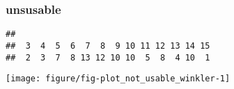 \documentclass[a4]{article}\usepackage[]{graphicx}\usepackage[]{color}
\makeatletter
\def\maxwidth{ %
  \ifdim\Gin@nat@width>\linewidth
    \linewidth
  \else
    \Gin@nat@width
  \fi
}
\newenvironment{kframe}{%
 \def\at@end@of@kframe{}%
 \ifinner\ifhmode%
  \def\at@end@of@kframe{\end{minipage}}%
  \begin{minipage}{\columnwidth}%
 \fi\fi%
 \def\FrameCommand##1{\hskip\@totalleftmargin \hskip-\fboxsep
 \colorbox{shadecolor}{##1}\hskip-\fboxsep
     \hskip-\linewidth \hskip-\@totalleftmargin \hskip\columnwidth}%
 \MakeFramed {\advance\hsize-\width
   \@totalleftmargin\z@ \linewidth\hsize
   \@setminipage}}%
 {\par\unskip\endMakeFramed%
 \at@end@of@kframe}
\newenvironment{knitrout}{}{} %
\makeatother
\begin{document}
\subsubsection{unsusable}
\begin{knitrout}
\color{fgcolor}\begin{kframe}
\begin{verbatim}
## 
##  3  4  5  6  7  8  9 10 11 12 13 14 15 
##  2  3  7  8 13 12 10 10  5  8  4 10  1
\end{verbatim}
\end{kframe}
\end{knitrout}
\begin{knitrout}
\color{fgcolor}
\texttt{[image: figure/fig-plot\_not\_usable\_winkler-1]} 

\end{knitrout}
\end{document}

